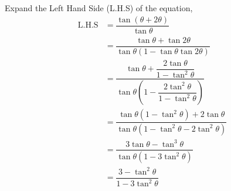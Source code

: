 \begin{solution}
  Expand the Left Hand Side (L.H.S) of the equation,
  \begin{align}
    \text{L.H.S} &= \dfrac{\tan(\theta+2\theta)}{\tan\theta} \\
                 &= \dfrac{\tan\theta+\tan2\theta}
                          {\tan\theta(1-\tan\theta\tan2\theta)} \\
                 &= \dfrac{\tan\theta+\dfrac{2\tan\theta}{1-\tan^2\theta}}
                          {\tan\theta
                            \left(1-\dfrac{2\tan^2\theta}
                                          {1-\tan^2\theta}\right)} \\
                 &= \dfrac{\tan\theta(1-\tan^2\theta)+2\tan\theta}
                          {\tan\theta(1-\tan^2\theta-2\tan^2\theta)} \\
				 &= \dfrac{3\tan\theta-\tan^3\theta}
				          {\tan\theta(1-3\tan^2\theta)} \\
				 &= \dfrac{3-\tan^2\theta}{1-3\tan^2\theta}
  \end{align}

\end{solution}
